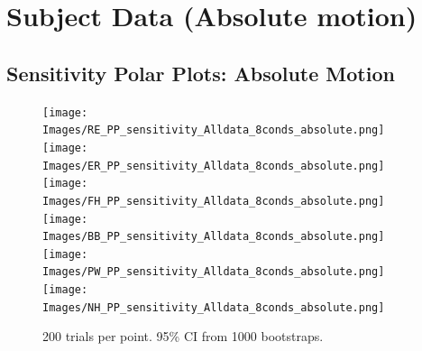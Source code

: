 \documentclass[11pt]{article} %
\begin{document}

\newpage
\section{Subject Data (Absolute motion)}
\subsection{Sensitivity Polar Plots: Absolute Motion}
\begin{figure}[H]
\centering %
\texttt{[image: Images/RE\_PP\_sensitivity\_Alldata\_8conds\_absolute.png]}
\texttt{[image: Images/ER\_PP\_sensitivity\_Alldata\_8conds\_absolute.png]}
\texttt{[image: Images/FH\_PP\_sensitivity\_Alldata\_8conds\_absolute.png]}
\texttt{[image: Images/BB\_PP\_sensitivity\_Alldata\_8conds\_absolute.png]}
\texttt{[image: Images/PW\_PP\_sensitivity\_Alldata\_8conds\_absolute.png]}
\texttt{[image: Images/NH\_PP\_sensitivity\_Alldata\_8conds\_absolute.png]}
\caption{200 trials per point. 95\% CI from 1000 bootstraps.}
\end{figure}
\end{document}
